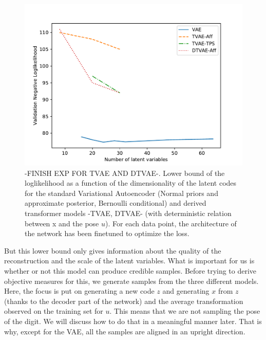 \documentclass[letterpaper, twoside]{article}
\begin{document}
\begin{figure}[h]
\centering
\includegraphics[scale=0.6]{num_latent.pdf}
\caption{-FINISH EXP FOR TVAE AND DTVAE-. Lower bound of the loglikelihood as a function of the dimensionality of the latent codes for the standard Variational Autoencoder (Normal priors and approximate posterior, Bernoulli conditional) and derived transformer models -TVAE, DTVAE- (with deterministic relation between x and the pose $u$). For each data point, the architecture of the network has been finetuned to optimize the loss.}
\label{numlatent}
\end{figure}

But this lower bound only gives information about the quality of the reconstruction and the scale of the latent variables. What is important for us is whether or not this model can produce credible samples. Before trying to derive objective measures for this, we generate samples from the three different models. Here, the focus is put on generating a new code $z$ and generating $x$ from $z$ (thanks to the decoder part of the network) and the average transformation observed on the training set for $u$. This means that we are not sampling the pose of the digit. We will discuss how to do that in a meaningful manner later. That is why, except for the VAE, all the samples are aligned in an upright direction.\\
\end{document}
